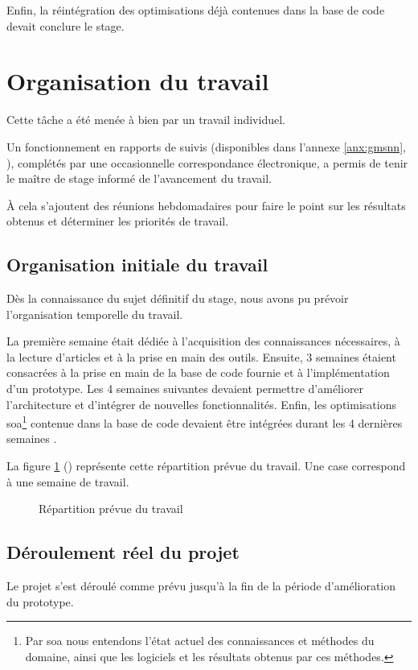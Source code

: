 Enfin, la réintégration des optimisations déjà contenues dans la base de code devait conclure le stage.

\section{Organisation du travail}
Cette tâche a été menée à bien par un travail individuel.

Un fonctionnement en rapports de suivis (disponibles dans l'annexe \ref{anx:gmsnn}, ), complétés par une occasionnelle correspondance électronique, a permis de tenir le maître de stage informé de l'avancement du travail.

À cela s'ajoutent des réunions hebdomadaires pour faire le point sur les résultats obtenus et déterminer les priorités de travail.

\subsection{Organisation initiale du travail}
Dès la connaissance du sujet définitif du stage, 
nous avons pu prévoir l'organisation temporelle du travail.

La première semaine était dédiée à l'acquisition des connaissances nécessaires, à la lecture d'articles et à la prise en main des outils.
Ensuite, 3 semaines étaient consacrées à la prise en main de la base de code fournie et à l'implémentation d'un prototype.
Les 4 semaines suivantes devaient permettre d'améliorer l'architecture et d'intégrer de nouvelles fonctionnalités.
Enfin, les optimisations \gls{soa}\footnote{Par \gls{soa} nous entendons l'état actuel des connaissances et méthodes du domaine, ainsi que les logiciels et les résultats obtenus par ces méthodes.\label{def:soa}} contenue dans la base de code devaient être intégrées durant les 4 dernières semaines .

La figure \ref{fig:gmsnn_time_1} () représente cette répartition prévue du travail.
Une case correspond à une semaine de travail.
\begin{figure}[ht]
	\centering
	\caption[Répartition prévue du travail]{Répartition prévue du travail}\label{fig:gmsnn_time_1}
\end{figure}

\subsection{Déroulement réel du projet}
Le projet s'est déroulé comme prévu jusqu'à la fin de la période d'amélioration du prototype.

